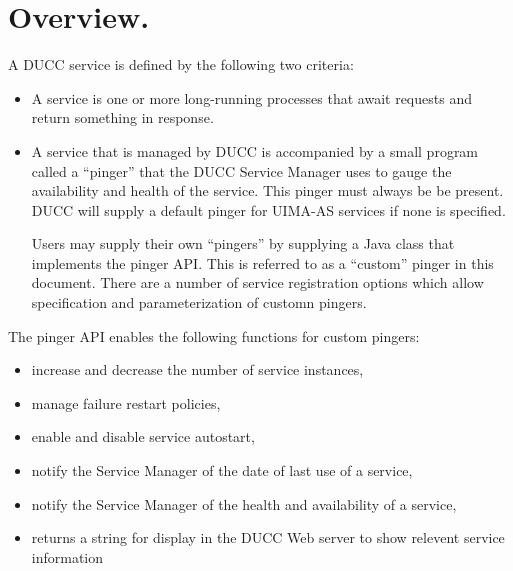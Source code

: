 % 
% 
% 
% 

      \section{Overview.} 
      A DUCC service is defined by the following two criteria:
      \begin{itemize}
          \item A service is one or more long-running processes that await requests
            and return something in response. 
          \item A service that is managed by DUCC is accompanied by a small program called a
            ``pinger'' that the DUCC Service Manager uses to gauge the availability and health of
            the service.  This pinger must always be be present. DUCC will supply a default
            pinger for UIMA-AS services if none is specified.
            
            Users may supply their own ``pingers'' by supplying a Java class that implements
            the pinger API.  This is referred to as a ``custom'' pinger in this document. 
            There are a number of service registration options which  allow
            specification and parameterization of customn pingers.

          \end{itemize}
      The pinger API enables the following functions for custom pingers:
      \begin{itemize}
      \item increase and decrease the number of service instances, 
      \item manage failure restart policies, 
      \item enable and disable service autostart, 
      \item notify the Service Manager of the date of last use of a service, 
      \item notify the Service Manager of the health and availability of a service, 
      \item returns a string for display in the DUCC Web server to show relevent service information
      \end{itemize}
      

